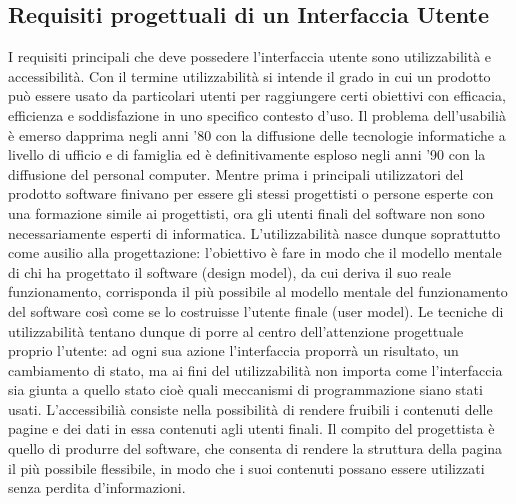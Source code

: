 \documentclass[12pt, a4paper, oneside]{book}
\begin{document}
\subsection{Requisiti progettuali di un Interfaccia Utente}
I requisiti principali che deve possedere l'interfaccia utente sono utilizzabilità e accessibilità. Con il termine utilizzabilità si intende il grado in cui un prodotto può essere usato da particolari utenti per raggiungere certi obiettivi con efficacia, efficienza e soddisfazione in uno specifico contesto d'uso. Il problema dell'usabilià è emerso dapprima negli anni '80 con la diffusione delle tecnologie informatiche a livello di ufficio e di famiglia ed è definitivamente esploso negli anni '90 con la diffusione del personal computer. Mentre prima i principali utilizzatori del prodotto software finivano per essere gli stessi progettisti o persone esperte con una formazione simile ai progettisti, ora gli utenti finali del software non sono necessariamente esperti di informatica. L'utilizzabilità nasce dunque soprattutto come ausilio alla progettazione: l'obiettivo è fare in modo che il modello mentale di chi ha progettato il software (design model), da cui deriva il suo reale funzionamento, corrisponda il più possibile al modello mentale del funzionamento del software così come se lo costruisse l'utente finale (user model). Le tecniche di utilizzabilità tentano dunque di porre al centro dell'attenzione progettuale proprio l'utente: ad ogni sua azione l'interfaccia proporrà un risultato, un cambiamento di stato, ma ai fini del utilizzabilità non importa come l'interfaccia sia giunta a quello stato cioè quali meccanismi di programmazione siano stati usati. L'accessibilià consiste nella possibilità di rendere fruibili i contenuti delle pagine e dei dati in essa contenuti agli utenti finali. Il compito del progettista è quello di produrre del software, che consenta di rendere la struttura della pagina il più possibile flessibile, in modo che i suoi contenuti possano essere utilizzati senza perdita d'informazioni.
\end{document}

